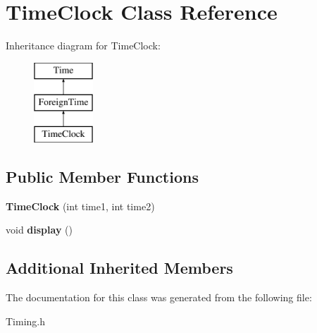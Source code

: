 \hypertarget{class_time_clock}{\section{Time\+Clock Class Reference}
\label{class_time_clock}
}
Inheritance diagram for Time\+Clock\+:\begin{figure}[H]
\begin{center}
\leavevmode
\includegraphics[height=3.000000cm]{class_time_clock}
\end{center}
\end{figure}
\subsection*{Public Member Functions}
\begin{DoxyCompactItemize}
\item 
\hypertarget{class_time_clock_ae6a3e28c5b3b5d38ee31deb6e197a67a}{{\bfseries Time\+Clock} (int time1, int time2)}\label{class_time_clock_ae6a3e28c5b3b5d38ee31deb6e197a67a}

\item 
\hypertarget{class_time_clock_acaa3cf5befe263aa89ceb8967862b560}{void {\bfseries display} ()}\label{class_time_clock_acaa3cf5befe263aa89ceb8967862b560}

\end{DoxyCompactItemize}
\subsection*{Additional Inherited Members}


The documentation for this class was generated from the following file\+:\begin{DoxyCompactItemize}
\item 
Timing.\+h\end{DoxyCompactItemize}
